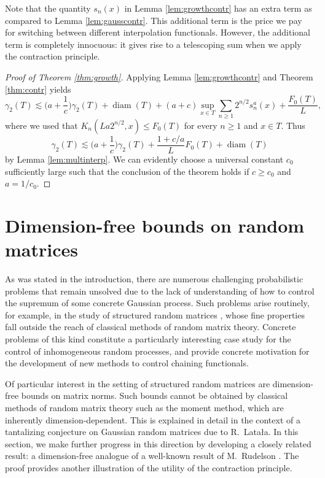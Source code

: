 \documentclass[10pt,reqno]{amsart}
\theoremstyle{definition}
\numberwithin{equation}{section}
\numberwithin{figure}{section}
\numberwithin{table}{section}
\newcommand{\diam}{\mathop{\mathrm{diam}}}
\begin{document}
Note that the quantity $s_n(x)$ in Lemma \ref{lem:growthcontr} has an 
extra term as compared to Lemma \ref{lem:gausscontr}. This additional term 
is the price we pay for switching between different interpolation 
functionals. However, the additional term is completely innocuous: it 
gives rise to a telescoping sum when we apply the contraction principle.

\begin{proof}[Proof of Theorem \ref{thm:growth}]
Applying Lemma \ref{lem:growthcontr} and Theorem \ref{thm:contr} yields
$$
	\gamma_2(T) \lesssim
	\bigg(a+\frac{1}{c}\bigg)\gamma_2(T) +
	\diam(T) + 
	(a+c)\sup_{x\in T}\sum_{n\ge 1}2^{n/2}s_n^a(x)
	+ \frac{F_0(T)}{L},
$$
where we used that $K_n(La2^{n/2},x)\le F_0(T)$ for every $n\ge 1$
and $x\in T$. Thus
$$
	\gamma_2(T) \lesssim
	\bigg(a+\frac{1}{c}\bigg)\gamma_2(T) +
	\frac{1+c/a}{L}F_0(T)
	+ \diam(T)
$$
by Lemma \ref{lem:multinterp}. We can evidently choose a universal 
constant $c_0$ sufficiently large such that the conclusion of the theorem
holds if $c\ge c_0$ and $a=1/c_0$.
\end{proof}


\section{Dimension-free bounds on random matrices}
\label{sec:rmt}

As was stated in the introduction, there are numerous challenging 
probabilistic problems that remain unsolved due to the lack of 
understanding of how to control the supremum of some concrete Gaussian 
process. Such problems arise routinely, for example, in the study of 
structured random matrices \cite{RV08,vH16b,vH17}, whose fine properties 
fall outside the reach of classical methods of random matrix theory. 
Concrete problems of this kind constitute a particularly interesting case 
study for the control of inhomogeneous random processes, and provide 
concrete motivation for the development of new methods to control chaining 
functionals.

Of particular interest in the setting of structured random matrices are 
dimension-free bounds on matrix norms. Such bounds cannot be obtained by 
classical methods of random matrix theory such as the moment method, which 
are inherently dimension-dependent. This is explained in detail 
\cite{vH16b,vH17} in the context of a tantalizing conjecture on Gaussian 
random matrices due to R.\ Lata{\l}a. In this section, we make further 
progress in this direction by developing a closely related result: a 
dimension-free analogue of a well-known result of M.\ Rudelson 
\cite{Rud96}. The proof provides another illustration of the utility of 
the contraction principle.
\end{document}
